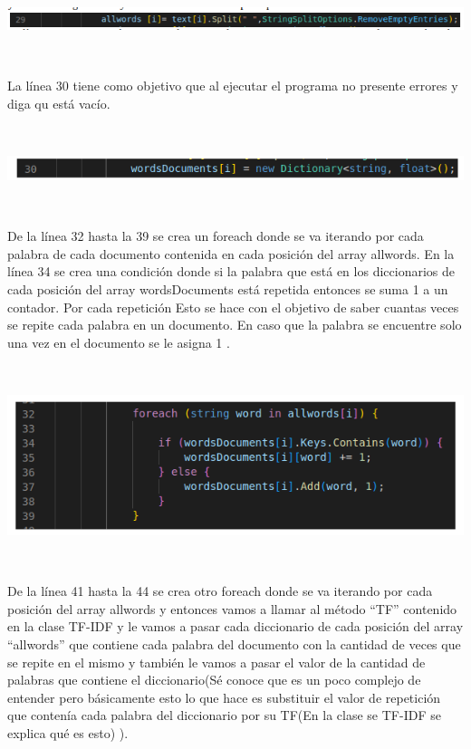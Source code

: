 \documentclass{article}
\begin{document}
{\

\centering
\includegraphics[height = 0.6 cm ]{Captura desde 2023-07-18 22-08-59.png}

\

La línea 30 tiene como objetivo que al ejecutar el programa no presente errores y diga qu está vacío.

\

\centering
\includegraphics[height = 0.6 cm ]{Captura desde 2023-07-18 22-11-17.png}

\

De la línea 32 hasta la 39 se crea un foreach donde se va iterando por cada palabra de cada documento contenida en cada posición  del array allwords.
En la línea 34 se crea una condición donde si la palabra que está en los diccionarios de cada posición del array wordsDocuments está repetida entonces 
se suma 1 a un contador. Por cada repetición  Esto se hace con el objetivo de saber cuantas veces se repite cada palabra en un documento. En caso  
que la palabra se encuentre solo una vez en el documento se le asigna 1 . 

\

\centering
\includegraphics[height = 3.7 cm ]{Captura desde 2023-07-18 22-18-36.png}

\

De la línea 41 hasta la 44 se crea otro foreach donde se va iterando por cada posición del array allwords y entonces vamos a llamar  al método “TF” 
contenido en la clase TF-IDF y le vamos a pasar cada diccionario de cada posición del array “allwords” que contiene cada palabra del documento con 
la cantidad de veces que se repite en el mismo y también le vamos a pasar el valor de la cantidad de palabras que contiene el diccionario(Sé conoce 
que es un poco complejo de entender pero básicamente esto lo que hace es substituir el valor de repetición que contenía cada palabra del diccionario 
por su TF(En la clase se TF-IDF se explica qué es esto) ).

}
\end{document}
